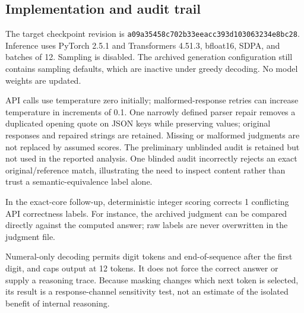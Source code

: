 \subsection{Implementation and audit trail}

The target checkpoint revision is \texttt{a09a35458c702b33eeacc393d103063234e8bc28}. Inference uses PyTorch 2.5.1 and Transformers 4.51.3, bfloat16, SDPA, and batches of 12. Sampling is disabled. The archived generation configuration still contains sampling defaults, which are inactive under greedy decoding. No model weights are updated.

API calls use temperature zero initially; malformed-response retries can increase temperature in increments of 0.1. One narrowly defined parser repair removes a duplicated opening quote on JSON keys while preserving values; original responses and repaired strings are retained. Missing or malformed judgments are not replaced by assumed scores. The preliminary unblinded audit is retained but not used in the reported analysis. One blinded audit incorrectly rejects an exact original/reference match, illustrating the need to inspect content rather than trust a semantic-equivalence label alone.

In the exact-core follow-up, deterministic integer scoring corrects 1 conflicting API correctness labels. For instance, the archived judgment can be compared directly against the computed answer; raw labels are never overwritten in the judgment file.

Numeral-only decoding permits digit tokens and end-of-sequence after the first digit, and caps output at 12 tokens. It does not force the correct answer or supply a reasoning trace. Because masking changes which next token is selected, its result is a response-channel sensitivity test, not an estimate of the isolated benefit of internal reasoning.
